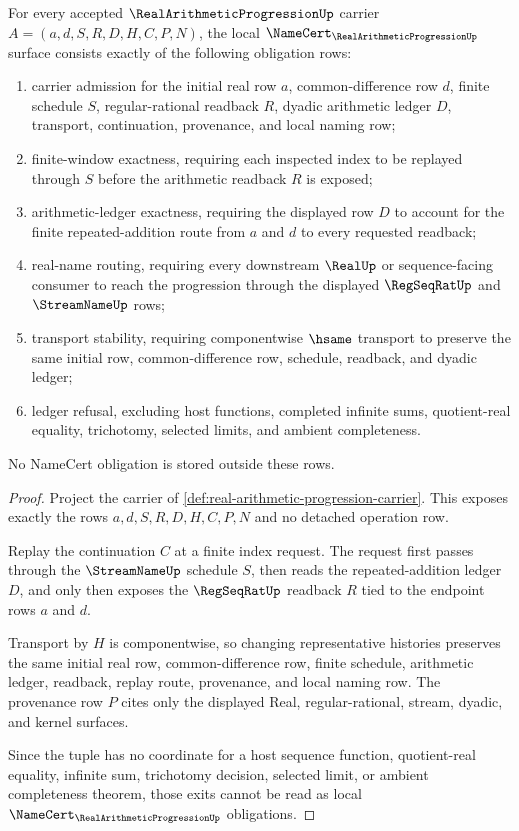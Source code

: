 \begin{theorem}
\label{thm:real-arithmetic-progression-namecert-obligations}
For every accepted $\RealArithmeticProgressionUp$ carrier $A=(a,d,S,R,D,H,C,P,N)$, the local $\NameCert_{\RealArithmeticProgressionUp}$ surface consists exactly of the following obligation rows:
\begin{enumerate}
\item carrier admission for the initial real row $a$, common-difference row $d$, finite schedule $S$, regular-rational readback $R$, dyadic arithmetic ledger $D$, transport, continuation, provenance, and local naming row;
\item finite-window exactness, requiring each inspected index to be replayed through $S$ before the arithmetic readback $R$ is exposed;
\item arithmetic-ledger exactness, requiring the displayed row $D$ to account for the finite repeated-addition route from $a$ and $d$ to every requested readback;
\item real-name routing, requiring every downstream $\RealUp$ or sequence-facing consumer to reach the progression through the displayed $\RegSeqRatUp$ and $\StreamNameUp$ rows;
\item transport stability, requiring componentwise $\hsame$ transport to preserve the same initial row, common-difference row, schedule, readback, and dyadic ledger;
\item ledger refusal, excluding host functions, completed infinite sums, quotient-real equality, trichotomy, selected limits, and ambient completeness.
\end{enumerate}
No NameCert obligation is stored outside these rows.
\end{theorem}
\begin{proof}
Project the carrier of \autoref{def:real-arithmetic-progression-carrier}. This exposes exactly the rows $a,d,S,R,D,H,C,P,N$ and no detached operation row.

Replay the continuation $C$ at a finite index request. The request first passes through the $\StreamNameUp$ schedule $S$, then reads the repeated-addition ledger $D$, and only then exposes the $\RegSeqRatUp$ readback $R$ tied to the endpoint rows $a$ and $d$.

Transport by $H$ is componentwise, so changing representative histories preserves the same initial real row, common-difference row, finite schedule, arithmetic ledger, readback, replay route, provenance, and local naming row. The provenance row $P$ cites only the displayed Real, regular-rational, stream, dyadic, and kernel surfaces.

Since the tuple has no coordinate for a host sequence function, quotient-real equality, infinite sum, trichotomy decision, selected limit, or ambient completeness theorem, those exits cannot be read as local $\NameCert_{\RealArithmeticProgressionUp}$ obligations.
\end{proof}

